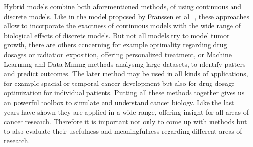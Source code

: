 Hybrid models combine both aforementioned methods, of using continuous and discrete models. Like in the model proposed by Franssen et al.~\cite{franssen_mathematical_2019}, these approaches allow to incorporate the exactness of continuous models with the wide range of biological effects of discrete models. \newline
But not all models try to model tumor growth, there are others concerning for example optimality regarding drug dosages or radiation exposition, offering personalized treatment, or Machine Learining and Data Mining methods analysing large datasets, to identify patters and predict outcomes. The later method may be used in all kinds of applications, for example spacial or temporal cancer development but also for drug dosage optimization for individual patients. Putting all these methods together gives us an powerful toolbox to simulate and understand cancer biology. Like the last years have shown they are applied in a wide range, offering insight for all areas of cancer research. Therefore it is important not only to come up with methods but to also evaluate their usefulness and meaningfulness regarding different areas of research.
